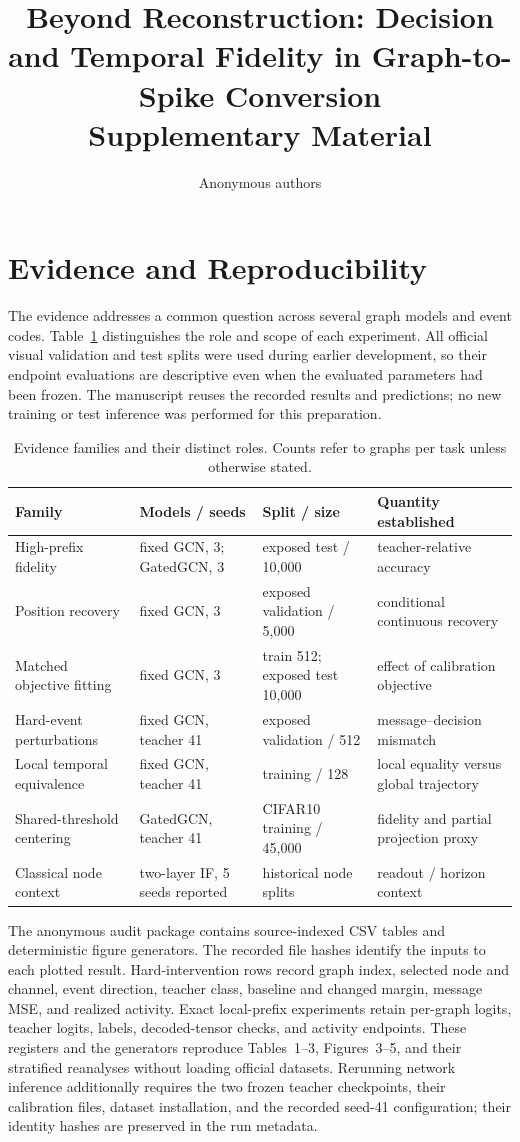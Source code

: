\documentclass[10pt,twocolumn,letterpaper]{article}
\title{Beyond Reconstruction: Decision and Temporal Fidelity in Graph-to-Spike Conversion\\Supplementary Material}
\author{Anonymous authors}
\begin{document}
\maketitle
\section{Evidence and Reproducibility}
The evidence addresses a common question across several graph models and event codes. Table~\ref{tab:scope} distinguishes the role and scope of each experiment. All official visual validation and test splits were used during earlier development, so their endpoint evaluations are descriptive even when the evaluated parameters had been frozen. The manuscript reuses the recorded results and predictions; no new training or test inference was performed for this preparation.

\begin{table}[t]\centering\small
\caption{Evidence families and their distinct roles. Counts refer to graphs per task unless otherwise stated.}
\label{tab:scope}
\setlength{\tabcolsep}{5pt}\begin{tabular}{llll}\toprule
Family & Models / seeds & Split / size & Quantity established\\\midrule
High-prefix fidelity & fixed GCN, 3; GatedGCN, 3 & exposed test / 10,000 & teacher-relative accuracy\\
Position recovery & fixed GCN, 3 & exposed validation / 5,000 & conditional continuous recovery\\
Matched objective fitting & fixed GCN, 3 & train 512; exposed test 10,000 & effect of calibration objective\\
Hard-event perturbations & fixed GCN, teacher 41 & exposed validation / 512 & message--decision mismatch\\
Local temporal equivalence & fixed GCN, teacher 41 & training / 128 & local equality versus global trajectory\\
Shared-threshold centering & GatedGCN, teacher 41 & CIFAR10 training / 45,000 & fidelity and partial projection proxy\\
Classical node context & two-layer IF, 5 seeds reported & historical node splits & readout / horizon context\\\bottomrule
\end{tabular}\end{table}

The anonymous audit package contains source-indexed CSV tables and deterministic figure generators. The recorded file hashes identify the inputs to each plotted result. Hard-intervention rows record graph index, selected node and channel, event direction, teacher class, baseline and changed margin, message MSE, and realized activity. Exact local-prefix experiments retain per-graph logits, teacher logits, labels, decoded-tensor checks, and activity endpoints. These registers and the generators reproduce Tables~1--3, Figures~3--5, and their stratified reanalyses without loading official datasets. Rerunning network inference additionally requires the two frozen teacher checkpoints, their calibration files, dataset installation, and the recorded seed-41 configuration; their identity hashes are preserved in the run metadata.
\end{document}
